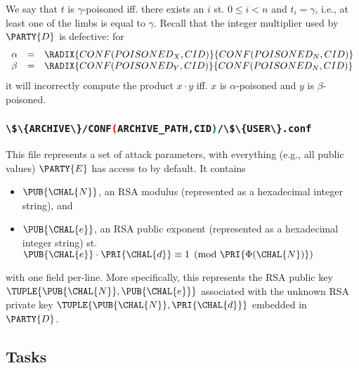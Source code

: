 \documentclass[crop={false},multi={true},tikz={true}]{standalone}
\begin{document}
\begin{itemize}
\[      \]
      We say that $t$ is $\gamma$-poisoned iff. there exists an $i$ st.
      $0 \leq i < n$ and $t_i = \gamma$, i.e., at least one of the limbs 
      is equal to $\gamma$.  Recall that the integer multiplier used by
      $\PARTY{D}$ is defective: for
      \[
      \begin{array}{lcl}
      \alpha &=& \RADIX{CONF(POISONED_X,CID)}{CONF(POISONED_N,CID)} \\
      \beta  &=& \RADIX{CONF(POISONED_Y,CID)}{CONF(POISONED_N,CID)} \\
      \end{array}
      \]
      it will incorrectly compute the product $x \cdot y$ iff. $x$ is 
      $\alpha$-poisoned and $y$ is $\beta$-poisoned.
\end{itemize}

\subsubsection{\lstinline[language={bash}]|\$\{ARCHIVE\}/CONF(ARCHIVE_PATH,CID)/\$\{USER\}.conf|}

This file represents a set of attack parameters, with everything (e.g.,
all public values) $\PARTY{E}$ has access to by default.  It contains 

\begin{itemize}
\item $\PUB{\CHAL{N}}$,
      an RSA modulus
      (represented as a  hexadecimal integer string),      
      and
\item $\PUB{\CHAL{e}}$,
      an RSA public exponent
      (represented as a  hexadecimal integer string)
      st. $\PUB{\CHAL{e}} \cdot \PRI{\CHAL{d}} \equiv 1 \pmod{\PRI{\Phi(\CHAL{N})}}$
\end{itemize}

\noindent
with one field per-line.
More specifically, this represents the RSA public key 
$
\TUPLE{ \PUB{\CHAL{N}}, \PUB{\CHAL{e}} }
$
associated with the unknown RSA private key 
$
\TUPLE{ \PUB{\CHAL{N}}, \PRI{\CHAL{d}} }
$
embedded in $\PARTY{D}$.

\subsection{Tasks}
\end{document}
